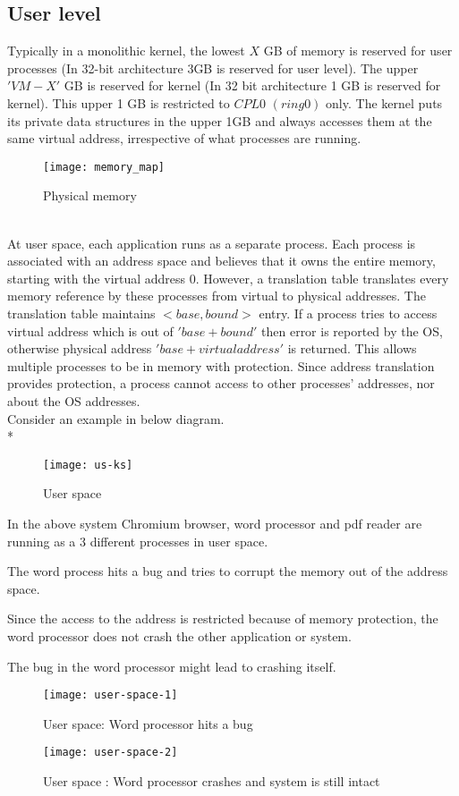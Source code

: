 \subsection{User level}

Typically in a monolithic kernel, the lowest $X$ GB of memory is reserved for user processes (In 32-bit architecture 3GB is reserved for user level). The upper $'VM - X'$ GB is reserved for kernel (In 32 bit architecture 1 GB is reserved for kernel). This upper 1 GB is restricted to $CPL 0$ $(ring 0)$ only. The kernel puts its private data structures in the upper 1GB and always accesses them at the same virtual address, irrespective of what processes are running. 
\\
\begin{figure}[!ht]
\centering
\texttt{[image: memory\_map]}
\caption{Physical memory}
\label{fig:memmap}
\end{figure}
\\
At user space, each application runs as a separate process. Each process is associated with an address space and believes that it owns the entire memory, starting with the virtual address 0.
However, a translation table translates every memory reference by these processes from virtual to physical addresses. The translation table maintains $<base, bound>$ entry. If a process tries to access virtual address which is out of $'base + bound'$ then error is reported by the OS, otherwise physical address $'base + virtual address'$ is returned. This allows multiple processes to be in memory with protection. Since address translation provides protection, a process cannot access to other processes’ addresses, nor about the OS addresses.
\\
Consider an example in below diagram.
\\*
\begin{figure}[!ht]
\centering
\texttt{[image: us-ks]}
\caption{User space}
\label{fig:User space}
\end{figure}
\begin{description}
\item In the above system Chromium browser, word processor and pdf reader are running as a 3 different processes in user space.
\item The word process hits a bug and tries to corrupt the memory out of the address space.
\item Since the access to the address is restricted because of memory protection, the word processor does not crash the other application or system.
\item The bug in the word processor might lead to crashing itself.
\end{description}
\begin{figure}[!ht]
\centering
\texttt{[image: user-space-1]}
\caption{User space: Word processor hits a bug}
\label{fig:User space}
\end{figure}
\begin{figure}[!ht]
\centering
\texttt{[image: user-space-2]}
\caption{User space : Word processor crashes and system is still intact}
\label{fig:User space}
\end{figure}

